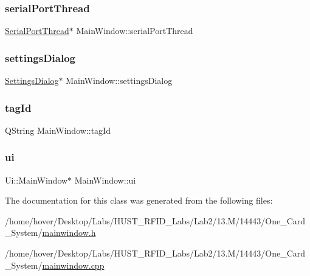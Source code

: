 \mbox{\label{class_main_window_aa9781bbd758a56ac8b1a58d4295aef54}} 
\subsubsection{\texorpdfstring{serialPortThread}{serialPortThread}}
{\footnotesize\ttfamily \mbox{\hyperlink{class_serial_port_thread}{Serial\+Port\+Thread}}$\ast$ Main\+Window\+::serial\+Port\+Thread\hspace{0.3cm}{\ttfamily [private]}}

\mbox{\label{class_main_window_aef5f3e9b117558b9c1d633231bd0d833}} 
\subsubsection{\texorpdfstring{settingsDialog}{settingsDialog}}
{\footnotesize\ttfamily \mbox{\hyperlink{class_settings_dialog}{Settings\+Dialog}}$\ast$ Main\+Window\+::settings\+Dialog\hspace{0.3cm}{\ttfamily [private]}}

\mbox{\label{class_main_window_aab96767ee78290ec955f98371500969f}} 
\subsubsection{\texorpdfstring{tagId}{tagId}}
{\footnotesize\ttfamily Q\+String Main\+Window\+::tag\+Id\hspace{0.3cm}{\ttfamily [private]}}

\mbox{\label{class_main_window_a35466a70ed47252a0191168126a352a5}} 
\subsubsection{\texorpdfstring{ui}{ui}}
{\footnotesize\ttfamily Ui\+::\+Main\+Window$\ast$ Main\+Window\+::ui\hspace{0.3cm}{\ttfamily [private]}}



The documentation for this class was generated from the following files\+:\begin{DoxyCompactItemize}
\item 
/home/hover/\+Desktop/\+Labs/\+H\+U\+S\+T\+\_\+\+R\+F\+I\+D\+\_\+\+Labs/\+Lab2/13.\+M/14443/\+One\+\_\+\+Card\+\_\+\+System/\mbox{\hyperlink{mainwindow_8h}{mainwindow.\+h}}\item 
/home/hover/\+Desktop/\+Labs/\+H\+U\+S\+T\+\_\+\+R\+F\+I\+D\+\_\+\+Labs/\+Lab2/13.\+M/14443/\+One\+\_\+\+Card\+\_\+\+System/\mbox{\hyperlink{mainwindow_8cpp}{mainwindow.\+cpp}}\end{DoxyCompactItemize}
